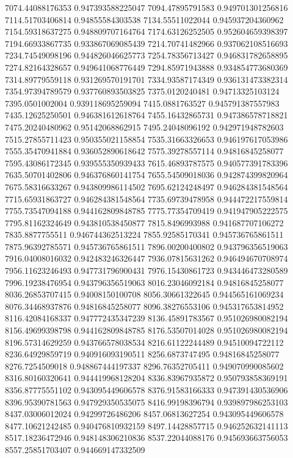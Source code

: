 {7074.44088176353 0.947393588225047
7094.47895791583 0.949701301256816
7114.51703406814 0.94855584303538
7134.55511022044 0.945937204360962
7154.59318637275 0.948809707164764
7174.63126252505 0.952604659398397
7194.66933867735 0.933867069085439
7214.70741482966 0.937062108516693
7234.74549098196 0.944826046625773
7254.78356713427 0.946831782658895
7274.82164328657 0.949641068776449
7294.85971943888 0.934854773680369
7314.89779559118 0.931269570191701
7334.93587174349 0.936131473382314
7354.97394789579 0.937760893503825
7375.0120240481 0.94713325103124
7395.0501002004 0.939118695259094
7415.0881763527 0.945791387557983
7435.12625250501 0.946381612618764
7455.16432865731 0.947386578718821
7475.20240480962 0.95142068862915
7495.24048096192 0.942971948782603
7515.27855711423 0.950355021158854
7535.31663326653 0.946197617053986
7555.35470941884 0.936052890618642
7575.39278557114 0.94816845258077
7595.43086172345 0.939555350939433
7615.46893787575 0.940577391783396
7635.50701402806 0.946376860141754
7655.54509018036 0.942874399820964
7675.58316633267 0.943809986114502
7695.62124248497 0.946284381548564
7715.65931863727 0.946284381548564
7735.69739478958 0.944472217559814
7755.73547094188 0.944162809848785
7775.77354709419 0.941947905222575
7795.81162324649 0.943810538450877
7815.8496993988 0.941687707106272
7835.8877755511 0.946744362513224
7855.92585170341 0.945736765861511
7875.96392785571 0.945736765861511
7896.00200400802 0.943796356519063
7916.04008016032 0.942483246326447
7936.07815631262 0.946494670708974
7956.11623246493 0.947731796900431
7976.15430861723 0.943446473280589
7996.19238476954 0.943796356519063
8016.23046092184 0.94816845258077
8036.26853707415 0.94008150100708
8056.30661322645 0.944565161069234
8076.34468937876 0.94816845258077
8096.38276553106 0.945317653814952
8116.42084168337 0.947772435347239
8136.45891783567 0.951026980082194
8156.49699398798 0.944162809848785
8176.53507014028 0.951026980082194
8196.57314629259 0.943766578038534
8216.61122244489 0.94510094722112
8236.64929859719 0.940916093190511
8256.6873747495 0.94816845258077
8276.7254509018 0.948867444197337
8296.76352705411 0.949070990085602
8316.80160320641 0.944419968128204
8336.83967935872 0.950793858369191
8356.87775551102 0.943095449606578
8376.91583166333 0.947391430536906
8396.95390781563 0.947929350535075
8416.99198396794 0.939897986253103
8437.03006012024 0.94299726486206
8457.06813627254 0.943095449606578
8477.10621242485 0.940476810932159
8497.14428857715 0.946252632141113
8517.18236472946 0.948148306210836
8537.22044088176 0.945693663756053
8557.25851703407 0.944669147332509
}
